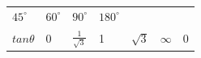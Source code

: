 {\begin{center}
\begin{xtabular*}{\mytablewidth}[t]{|p{10\mystarwidth}|p{10\mystarwidth}|p{10\mystarwidth}|p{10\mystarwidth}|p{10\mystarwidth}|p{10\mystarwidth}|p{10\mystarwidth}|}
                  ${45}^{\circ }$
                 &
                  ${60}^{\circ }$
                 &
                  ${90}^{\circ }$
                 &
                  ${180}^{\circ }$
     \tabularnewline{}
                  $tan\theta $
                 &
        0 &
                  $\frac{1}{\sqrt{3}}$
                 &
        1 &
                  $\sqrt{3}$
                 &
                  $\infty $
                 &
        0%

\end{xtabular*}
\end{center}}
